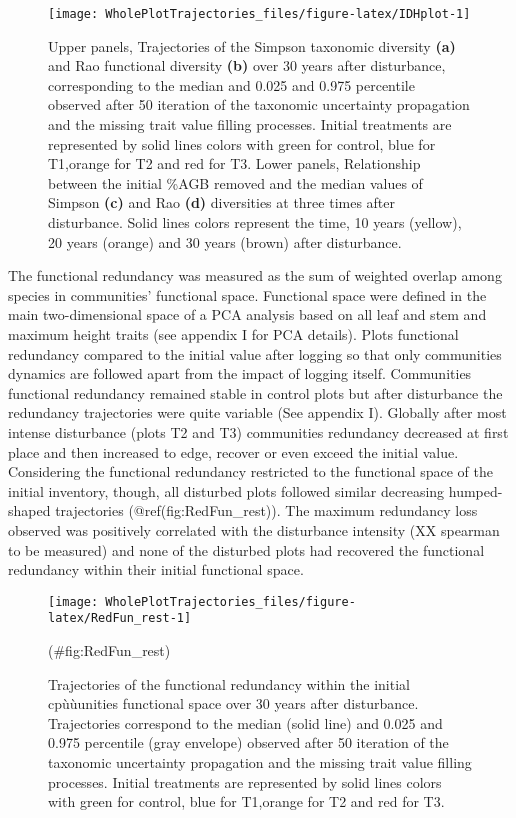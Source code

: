 \documentclass[fleqn,10pt]{ArtEcoFoG} %
\theoremstyle{definition}
\theoremstyle{definition}
\theoremstyle{definition}
\theoremstyle{remark}
\begin{document}
\begin{figure*}

{\centering \texttt{[image: WholePlotTrajectories\_files/figure-latex/IDHplot-1]} 

}

\caption{Upper panels, Trajectories of the Simpson taxonomic diversity \textbf{(a)} and Rao functional diversity \textbf{(b)} over 30 years after disturbance, corresponding to the median and 0.025 and 0.975 percentile observed after 50 iteration of the taxonomic uncertainty propagation and the missing trait value filling processes. Initial treatments are represented by solid lines colors with green for control, blue for T1,orange for T2 and red for T3. Lower panels, Relationship between the initial \%AGB removed and the median values of Simpson \textbf{(c)} and Rao \textbf{(d)} diversities at three times after disturbance. Solid lines colors represent the time, 10 years (yellow), 20 years (orange) and 30 years (brown) after disturbance.}\label{fig:IDHplot}
\end{figure*}

The functional redundancy was measured as the sum of weighted overlap
among species in communities' functional space. Functional space were
defined in the main two-dimensional space of a PCA analysis based on all
leaf and stem and maximum height traits (see appendix I for PCA
details). Plots functional redundancy compared to the initial value
after logging so that only communities dynamics are followed apart from
the impact of logging itself. Communities functional redundancy remained
stable in control plots but after disturbance the redundancy
trajectories were quite variable (See appendix I). Globally after most
intense disturbance (plots T2 and T3) communities redundancy decreased
at first place and then increased to edge, recover or even exceed the
initial value. Considering the functional redundancy restricted to the
functional space of the initial inventory, though, all disturbed plots
followed similar decreasing humped-shaped trajectories
(@ref(fig:RedFun\_rest)). The maximum redundancy loss observed was
positively correlated with the disturbance intensity (XX spearman to be
measured) and none of the disturbed plots had recovered the functional
redundancy within their initial functional space.

\begin{figure}

{\centering \texttt{[image: WholePlotTrajectories\_files/figure-latex/RedFun\_rest-1]} 

}

\caption{Trajectories of the functional redundancy within the initial cpùùunities functional space over 30 years after disturbance. Trajectories correspond to the median (solid line) and 0.025 and 0.975 percentile (gray envelope) observed after 50 iteration of the taxonomic uncertainty propagation and the missing trait value filling processes. Initial treatments are represented by solid lines colors with green for control, blue for T1,orange for T2 and red for T3.}(\#fig:RedFun_rest)
\end{figure}
\end{document}
